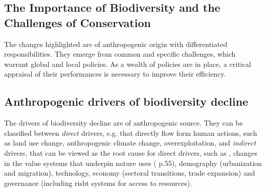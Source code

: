 \subsection*{The Importance of Biodiversity and the Challenges of Conservation}

The changes highlighted are of anthropogenic origin with differentiated responsibilities. They emerge from common and specific challenges, which warrant global and local policies. As a wealth of policies are in place, a critical appraisal of their performances is necessary to improve their efficiency.


\subsection*{Anthropogenic drivers of biodiversity decline}

The drivers of biodiversity decline are of anthropogenic source. They can be classified between \textit{direct} drivers, e.g. that directly flow form human actions, such as land use change, anthropogenic climate change, overexploitation, and \textit{indirect} drivers, that can be viewed as the root cause for direct drivers, such as  , changes in the value systems that underpin nature uses (\cite{ipbes_2022_6417333} p.55), demography (urbanization and migration), technology, economy (sectoral transitions, trade expansion) and governance (including risht systems for access to resources).

